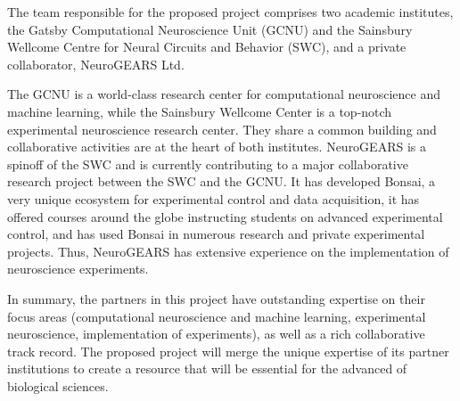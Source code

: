 The team responsible for the proposed project comprises two academic
institutes, the Gatsby Computational Neuroscience Unit (GCNU) and the Sainsbury
Wellcome Centre for Neural Circuits and Behavior (SWC), and a private
collaborator, NeuroGEARS Ltd.

The GCNU is a world-class research center for computational neuroscience and
machine learning, while the Sainsbury Wellcome Center is a top-notch experimental
neuroscience research center. They share a common building and collaborative
activities are at the heart of both institutes.
%
NeuroGEARS is a spinoff of the SWC and is currently contributing to a major
collaborative research project between the SWC and the GCNU. It has developed
Bonsai, a very unique ecosystem for experimental control and data acquisition,
it has offered courses around the globe instructing students on advanced
experimental control, and has used Bonsai in numerous research and private
experimental projects. Thus, NeuroGEARS has extensive experience on the
implementation of neuroscience experiments.

In summary, the partners in this project have outstanding expertise on their
focus areas (computational neuroscience and machine learning, experimental
neuroscience, implementation of experiments), as well as a rich collaborative
track record. The proposed project will merge the unique expertise of its
partner institutions to create a resource that will be essential for the
advanced of biological sciences.
